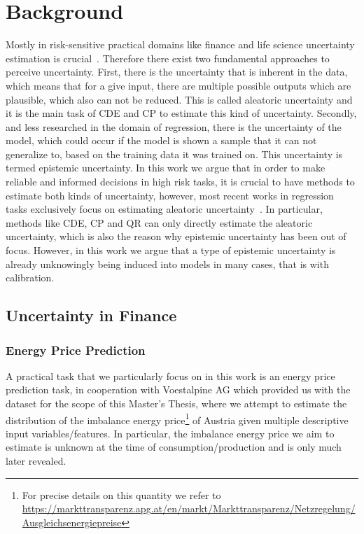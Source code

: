 \section{Background}\label{sec:background}

Mostly in risk-sensitive practical domains like finance and life science uncertainty estimation is crucial~\cite{abdar2021review, xia2020uncertainty, ghesu2021quantifying, mashrur2020machine}. Therefore there exist two fundamental approaches to perceive uncertainty. First, there is the uncertainty that is inherent in the data, which means that for a give input, there are multiple possible outputs which are plausible, which also can not be reduced. This is called aleatoric uncertainty and it is the main task of CDE and CP to estimate this kind of uncertainty. Secondly, and less researched in the domain of regression, there is the uncertainty of the model, which could occur if the model is shown a sample that it can not generalize to, based on the training data it was trained on. This uncertainty is termed epistemic uncertainty. In this work we argue that in order to make reliable and informed decisions in high risk tasks, it is crucial to have methods to estimate both kinds of uncertainty, however, most recent works in regression tasks exclusively focus on estimating aleatoric uncertainty~\cite{romano2019conformalized, sesia2020comparison, angelopoulos2021gentle,chernozhukov2021distributional,sesia2021conformal, oliveira2022split, romano2022conformal, izbicki2022cd, gupta2022nested, auer2024conformal}. In particular, methods like CDE, CP and QR can only directly estimate the aleatoric uncertainty, which is also the reason why epistemic uncertainty has been out of focus. However, in this work we argue that a type of epistemic uncertainty is already unknowingly being induced into models in many cases, that is with calibration.

\subsection{Uncertainty in Finance}\label{sec:intro_finance}

\subsubsection{Energy Price Prediction}

A practical task that we particularly focus on in this work is an energy price prediction task, in cooperation with Voestalpine AG which provided us with the dataset for the scope of this Master's Thesis, where we attempt to estimate the distribution of the imbalance energy price\footnote{For precise details on this quantity we refer to \url{https://markttransparenz.apg.at/en/markt/Markttransparenz/Netzregelung/Ausgleichsenergiepreise}} of Austria given multiple descriptive input variables/features. In particular, the imbalance energy price we aim to estimate is unknown at the time of consumption/production and is only much later revealed.

